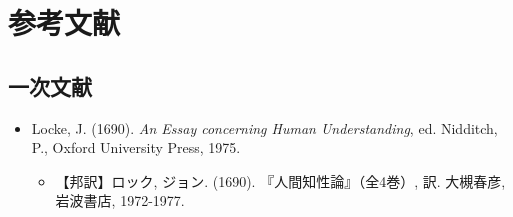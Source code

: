 \documentclass[a4j,oneside]{jsbook}
\begin{document}
\chapter*{参考文献}
\section*{一次文献}
\begin{itemize}
\item{} Locke, J. (1690). {\itshape An Essay concerning Human Understanding}, ed. Nidditch, P., Oxford University Press, 1975.
\begin{itemize}
\item{} 【邦訳】ロック, ジョン. (1690). 『人間知性論』（全4巻）, 訳. 大槻春彦, 岩波書店, 1972-1977.
\end{itemize}
\end{itemize}
\end{document}
